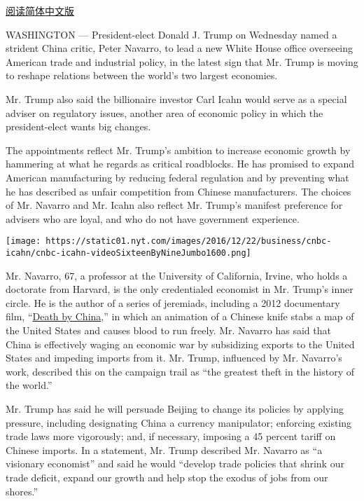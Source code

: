 \href{http://cn.nytimes.com/usa/20161222/peter-navarro-carl-icahn-trump-china-trade/}{阅读简体中文版}

WASHINGTON --- President-elect Donald J. Trump on Wednesday named a
strident China critic, Peter Navarro, to lead a new White House office
overseeing American trade and industrial policy, in the latest sign that
Mr. Trump is moving to reshape relations between the world's two largest
economies.

Mr. Trump also said the billionaire investor Carl Icahn would serve as a
special adviser on regulatory issues, another area of economic policy in
which the president-elect wants big changes.

The appointments reflect Mr. Trump's ambition to increase economic
growth by hammering at what he regards as critical roadblocks. He has
promised to expand American manufacturing by reducing federal regulation
and by preventing what he has described as unfair competition from
Chinese manufacturers. The choices of Mr. Navarro and Mr. Icahn also
reflect Mr. Trump's manifest preference for advisers who are loyal, and
who do not have government experience.

\texttt{[image: https://static01.nyt.com/images/2016/12/22/business/cnbc-icahn/cnbc-icahn-videoSixteenByNineJumbo1600.png]}

Mr. Navarro, 67, a professor at the University of California, Irvine,
who holds a doctorate from Harvard, is the only credentialed economist
in Mr. Trump's inner circle. He is the author of a series of jeremiads,
including a 2012 documentary film,
``\href{https://www.youtube.com/watch?v=mMlmjXtnIXI}{Death by China},''
in which an animation of a Chinese knife stabs a map of the United
States and causes blood to run freely. Mr. Navarro has said that China
is effectively waging an economic war by subsidizing exports to the
United States and impeding imports from it. Mr. Trump, influenced by Mr.
Navarro's work, described this on the campaign trail as ``the greatest
theft in the history of the world.''

Mr. Trump has said he will persuade Beijing to change its policies by
applying pressure, including designating China a currency manipulator;
enforcing existing trade laws more vigorously; and, if necessary,
imposing a 45 percent tariff on Chinese imports. In a statement, Mr.
Trump described Mr. Navarro as ``a visionary economist'' and said he
would ``develop trade policies that shrink our trade deficit, expand our
growth and help stop the exodus of jobs from our shores.''

